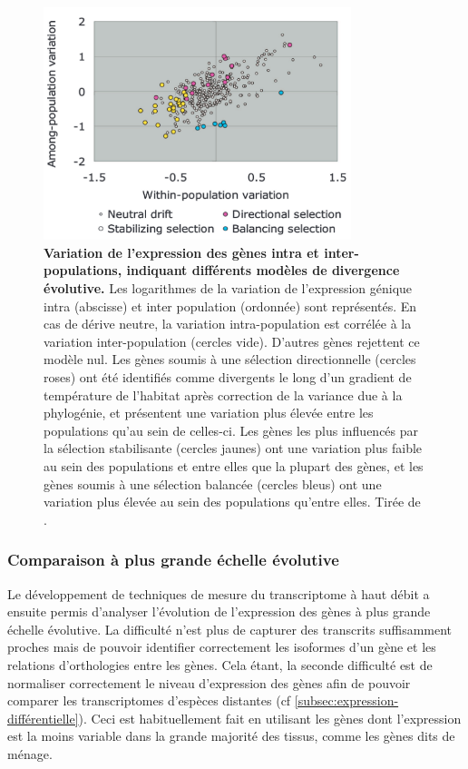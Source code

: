 \begin{figure}[h]
    \centering
    \includegraphics[width=0.8\textwidth, page=1] {figures/introduction/fig25.png}
    \caption[Variation de l'expression des gènes intra et inter-populations, indiquant différents modèles de divergence évolutive.]{
    \textbf{Variation de l'expression des gènes intra et inter-populations, indiquant différents modèles de divergence évolutive.}
     Les logarithmes de la variation de l'expression génique intra (abscisse) et inter population (ordonnée) sont représentés. En cas de dérive neutre, la variation intra-population est corrélée à la variation inter-population (cercles vide). D'autres gènes rejettent ce modèle nul. Les gènes soumis à une sélection directionnelle (cercles roses) ont été identifiés comme divergents le long d'un gradient de température de l'habitat après correction de la variance due à la phylogénie, et présentent une variation plus élevée entre les populations qu'au sein de celles-ci. Les gènes les plus influencés par la sélection stabilisante (cercles jaunes) ont une variation plus faible au sein des populations et entre elles que la plupart des gènes, et les gènes soumis à une sélection balancée (cercles bleus) ont une variation plus élevée au sein des populations qu'entre elles. Tirée de \citep{whitehead_neutral_2006}.\\
    }
    \label{fig:Fig25}
\end{figure} 

\subsubsection{Comparaison à plus grande échelle évolutive}
\label{subsec:comp-grande-echelle}

Le développement de techniques de mesure du transcriptome à haut débit a ensuite permis d’analyser l’évolution de l’expression des gènes à plus grande échelle évolutive. La difficulté n’est plus de capturer des transcrits suffisamment proches mais de pouvoir identifier correctement les isoformes d’un gène et les relations d’orthologies entre les gènes. Cela étant, la seconde difficulté est de normaliser correctement le niveau d’expression des gènes afin de pouvoir comparer les transcriptomes d’espèces distantes (cf \ref{subsec:expression-différentielle}). Ceci est habituellement fait en utilisant les gènes dont l’expression est la moins variable dans la grande majorité des tissus, comme les gènes dits de ménage. 

